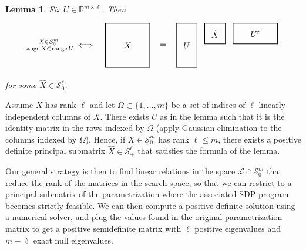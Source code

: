 \documentclass{amsart}
\newtheorem{lemma}[theorem]{Lemma}
\theoremstyle{definition}
\theoremstyle{remark}
\numberwithin{equation}{section}
\DeclareMathOperator{\range}{range}
\newcommand{\Sym}{{\mathcal S}}
\newcommand{\eLL}{{\mathcal L}}
\newcommand{\R}{{\mathbb R}}
\begin{document}
\begin{lemma}
Fix $U \in \R^{m \times \ell}$. Then
\[
\begin{tikzpicture}[x=3in,y=2in]
    \tikzstyle{ann} = [draw=none,fill=none,right]
    \matrix[nodes={draw, thick, fill=none},
        row sep=0.3cm,column sep=0.3cm]
    {
    \node[draw=none,fill=none] (N1) {$\substack{X \in \Sym^m_0  \\ \range X \subset \range U} \iff$}; &
    \node[rectangle, minimum height=0.75in, minimum width = 0.75in] (N2) {$X$}; &
    \node[draw=none] (N3) {$=$}; &
    \node[rectangle, minimum height=0.75in, minimum width = 0.35in] (N4) {$U$}; &
    \node[rectangle, minimum height=0.35in, minimum width = 0.35in,  anchor=north west] (N5) at ([xshift=1cm]N4.north east) {$\hat X$}; &
    \node[rectangle, minimum height=0.35in, minimum width = 0.75in,  anchor=north west] (N6) at ([xshift=1cm]N5.north east) {$U^t$}; &
    \\
    };
\end{tikzpicture}
\]
for some $\hat X \in \Sym_0^\ell$.
\end{lemma}

Assume $X$ has rank $\ell$ and let $\Omega \subset \{1, \dots, m\}$ be a set of indices of $\ell$ linearly independent columns of $X$. There exists $U$ as in the lemma such that it is the identity matrix in the rows indexed by $\Omega$ (apply Gaussian elimination to the columns indexed by $\Omega$). Hence, if $X \in \Sym_0^m$ has rank $\ell \le m$, there exists a positive definite principal submatrix $\hat X \in \Sym_+^\ell$ that satisfies the formula of the lemma.



Our general strategy is then to find linear relations in the space $\eLL \cap \Sym_0^m$ that reduce the rank of the matrices in the search space, so that we can restrict to a principal submatrix of the parametrization where the associated SDP program becomes strictly feasible. We can then compute a positive definite solution using a numerical solver, and plug the values found in the original parametrization matrix to get a positive semidefinite matrix with $\ell$ positive eigenvalues and $m - \ell$ exact null eigenvalues.
\end{document}
